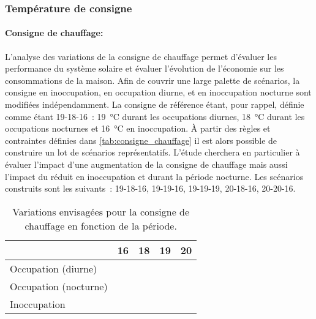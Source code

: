 \subsubsection{Température de consigne} %
\label{ssub:temperature_de_consigne}
\paragraph{Consigne de chauffage:} %
\label{par:consigne_de_chauffage}
L’analyse des variations de la consigne de chauffage permet d’évaluer les performance du
système solaire et évaluer l’évolution de l’économie sur les consommations de la maison.
Afin de couvrir une large palette de scénarios, la consigne en inoccupation, en occupation
diurne, et en inoccupation nocturne sont modifiées indépendamment. La consigne de
référence étant, pour rappel, définie comme étant 19-18-16~: \SI{19}{\celsius} durant les
occupations diurnes, \SI{18}{\celsius} durant les occupations nocturnes et
\SI{16}{\celsius} en inoccupation. À partir des règles et contraintes définies dans
\autoref{tab:consigne_chauffage} il est alors possible de construire un lot de scénarios
représentatifs. L’étude cherchera en particulier à évaluer l’impact d’une augmentation de
la consigne de chauffage mais aussi l’impact du réduit en inoccupation et durant la
période nocturne. Les scénarios construits sont les suivants~: 19-18-16, 19-19-16,
19-19-19, 20-18-16, 20-20-16.

\begin{table}
\centering
\begin{tabular}{l c c c c}
    \toprule
                    & \bf{16}             & \bf{18}             & \bf{19}             & \bf{20}              \\
    \midrule
    Occupation (diurne)    &                     &                     & \cellcolor{SolarizedBrBlue} & \cellcolor{SolarizedBrBlue} \\
    Occupation (nocturne)  &                     & \cellcolor{SolarizedBrBlue} & \cellcolor{SolarizedBrBlue} & \cellcolor{SolarizedBrBlue} \\
    Inoccupation         & \cellcolor{SolarizedBrBlue} &                     & \cellcolor{SolarizedBrBlue} &                     \\
    \bottomrule
\end{tabular}
\caption{Variations envisagées pour la consigne de chauffage en fonction de la période.}
         \label{tab:consigne_chauffage}
\end{table}


